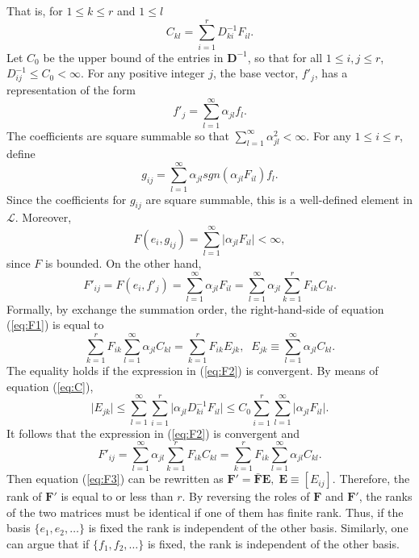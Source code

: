\documentclass[12pt,onecolumn,draftcls]{IEEEtran}
\begin{document}
That is, for $1 \leq k \leq r$ and $1 \leq l$
\begin{equation}
C_{kl}=\sum_{i=1}^r D^{-1}_{ki}F_{il}.
\label{eq:C}
\end{equation}
Let $C_0$ be the upper bound of the entries in $\mathbf{D}^{-1}$, so that for all $1 \leq i,j \leq r$,
$D_{ij}^{-1} \leq C_0 < \infty.$
For any positive integer $j$, the base vector, $f'_j$, has a representation of the form
\begin{equation}
f'_j = \sum_{l=1}^\infty \alpha_{jl}f_l.
\end{equation}
The coefficients are square summable so that
$\sum_{l=1}^\infty \alpha_{jl}^2 < \infty.$
For any $1 \leq i \leq r$, define
\begin{equation}
g_{ij} = \sum_{l=1}^\infty \alpha_{jl}sgn(\alpha_{jl}F_{il})f_l.
\end{equation}
Since the coefficients for $g_{ij}$ are square summable, this is a well-defined element in $\mathcal{L}$.
Moreover,
\begin{equation}
F(e_i, g_{ij}) = \sum_{l=1}^\infty \vert \alpha_{jl}F_{il} \vert < \infty,
\end{equation}
since $F$  is bounded.  On the other hand,
\begin{equation}
F'_{ij}=F(e_i, f'_j) = \sum_{l=1}^\infty \alpha_{jl}F_{il}
=\sum_{l=1}^\infty \alpha_{jl} \sum_{k=1}^r F_{ik}C_{kl}.
\label{eq:F1}
\end{equation}
Formally, by exchange the summation order, the right-hand-side of equation (\ref{eq:F1}) is equal to
\begin{equation}
\sum_{k=1}^r F_{ik} \sum_{l=1}^\infty \alpha_{jl}C_{kl}
= \sum_{k=1}^r F_{ik}E_{jk}, \; \;  E_{jk} \equiv \sum_{l=1}^\infty \alpha_{jl}C_{kl}.
\label{eq:F2}
\end{equation}
The equality holds if the expression in (\ref{eq:F2}) is convergent.
By means of equation (\ref{eq:C}),
\begin{equation}
\vert E_{jk} \vert  \leq
\sum_{l=1}^\infty \sum_{i=1}^r \vert \alpha_{jl}D^{-1}_{ki}F_{il} \vert
\leq    C_0 \sum_{i=1}^r \sum_{l=1}^\infty   \vert \alpha_{jl}F_{il} \vert.
\end{equation}
It follows that the expression in (\ref{eq:F2}) is convergent and
\begin{equation}
F'_{ij}
=\sum_{l=1}^\infty \alpha_{jl} \sum_{k=1}^r F_{ik}C_{kl}
=\sum_{k=1}^r F_{ik} \sum_{l=1}^\infty \alpha_{jl}C_{kl}.
\label{eq:F3}
\end{equation}
Then equation (\ref{eq:F3}) can be rewritten as
$\mathbf{F}'=\mathbf{\bar{F}}\mathbf{E}, \;
\mathbf{E} \equiv
\left[
E_{ij}
\right].$
Therefore, the rank of $\mathbf{F}'$ is equal to or less than $r$.  By reversing the roles of $\mathbf{F}$ and $\mathbf{F}'$,
the ranks of the two matrices must be identical if one of them has finite rank.   Thus, if
the basis $\{e_1, e_2, \ldots \}$ is fixed the rank is independent of the other basis. 
Similarly, one can argue that if $\{f_1, f_2, \ldots \}$ is fixed, the rank is independent of the other basis.
\end{document}
